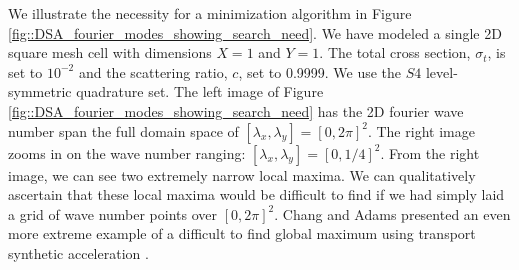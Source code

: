 We illustrate the necessity for a minimization algorithm in Figure \ref{fig::DSA_fourier_modes_showing_search_need}. We have modeled a single 2D square mesh cell with dimensions $X=1$ and $Y=1$. The total cross section, $\sigma_t$, is set to $10^{-2}$ and the scattering ratio, $c$, set to 0.9999. We use the $S4$ level-symmetric quadrature set. The left image of Figure \ref{fig::DSA_fourier_modes_showing_search_need} has the 2D fourier wave number span the full domain space of $[\lambda_x,\lambda_y]=[0,2 \pi]^2$. The right image zooms in on the wave number ranging: $[\lambda_x,\lambda_y]=[0,1/4]^2$. From the right image, we can see two extremely narrow local maxima. We can qualitatively ascertain that these local maxima would be difficult to find if we had simply laid a grid of wave number points over $[0,2 \pi]^2$. Chang and Adams presented an even more extreme example of a difficult to find global maximum using transport synthetic acceleration \cite{chang2003analysis}.

